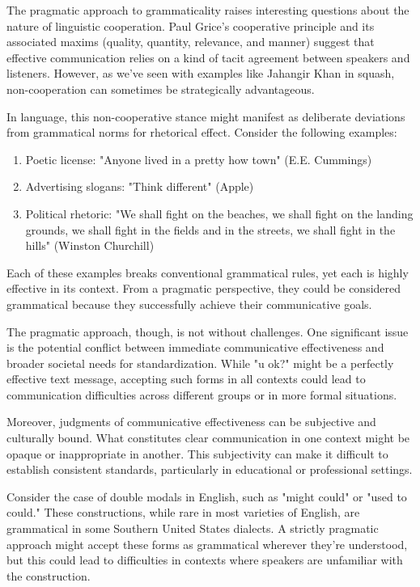 The pragmatic approach to grammaticality raises interesting questions about the nature of linguistic cooperation. Paul Grice's cooperative principle and its associated maxims (quality, quantity, relevance, and manner) suggest that effective communication relies on a kind of tacit agreement between speakers and listeners. However, as we've seen with examples like Jahangir Khan in squash, non-cooperation can sometimes be strategically advantageous.

In language, this non-cooperative stance might manifest as deliberate deviations from grammatical norms for rhetorical effect. Consider the following examples:

\begin{enumerate}
    \item Poetic license: "Anyone lived in a pretty how town" (E.E. Cummings)
    \item Advertising slogans: "Think different" (Apple)
    \item Political rhetoric: "We shall fight on the beaches, we shall fight on the landing grounds, we shall fight in the fields and in the streets, we shall fight in the hills" (Winston Churchill)
\end{enumerate}

Each of these examples breaks conventional grammatical rules, yet each is highly effective in its context. From a pragmatic perspective, they could be considered grammatical because they successfully achieve their communicative goals.

\bigskip


The pragmatic approach, though, is not without challenges. One significant issue is the potential conflict between immediate communicative effectiveness and broader societal needs for standardization. While "u ok?" might be a perfectly effective text message, accepting such forms in all contexts could lead to communication difficulties across different groups or in more formal situations.

Moreover, judgments of communicative effectiveness can be subjective and culturally bound. What constitutes clear communication in one context might be opaque or inappropriate in another. This subjectivity can make it difficult to establish consistent standards, particularly in educational or professional settings.

Consider the case of double modals in English, such as "might could" or "used to could." These constructions, while rare in most varieties of English, are grammatical in some Southern United States dialects. A strictly pragmatic approach might accept these forms as grammatical wherever they're understood, but this could lead to difficulties in contexts where speakers are unfamiliar with the construction.

